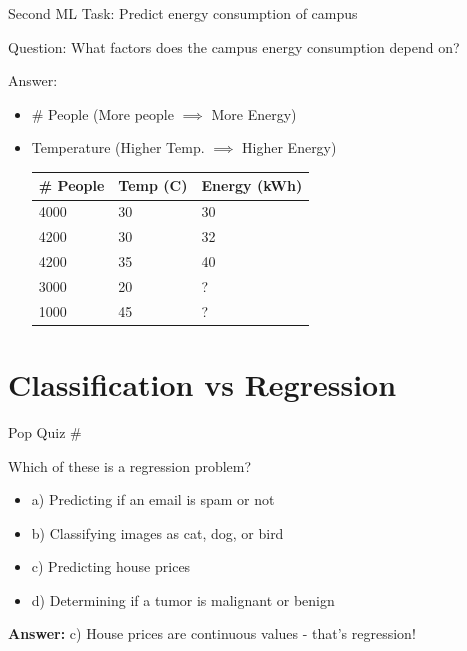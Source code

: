 \documentclass[usenames,dvipsnames]{beamer}
\begin{document}
\begin{frame}{Second ML Task: Predict energy consumption of campus}

Question: What factors does the campus energy consumption depend on?

Answer:\begin{itemize}
	\item \pause \# People (More people $\implies$ More Energy)
	\item \pause Temperature (Higher Temp. $\implies$ Higher Energy)

\pause \begin{table}[]
	\begin{tabular}{|l|l||l|}
		\hline 
		
		\textbf{\# People} & \textbf{Temp (C)} &  \textbf{Energy (kWh)} \\ \hline 
		
		4000 & 30 & 30 \\
		4200 & 30 & 32 \\
		4200 & 35 & 40 \\ \hline
		3000 & 20& ? \\
		1000 & 45 & ? \\ \hline          
	\end{tabular}
\end{table}	
\end{itemize}

\end{frame}





\section{Classification vs Regression}

\begin{frame}{Pop Quiz \#\thepopquiz}
\begin{popquizbox}{\thepopquiz}
Which of these is a regression problem?
\begin{itemize}
	\item a) Predicting if an email is spam or not
	\item b) Classifying images as cat, dog, or bird
	\item c) Predicting house prices
	\item d) Determining if a tumor is malignant or benign
\end{itemize}
\pause
\textbf{Answer:} c) House prices are continuous values - that's regression!
\end{popquizbox}
\end{frame}
\end{document}
